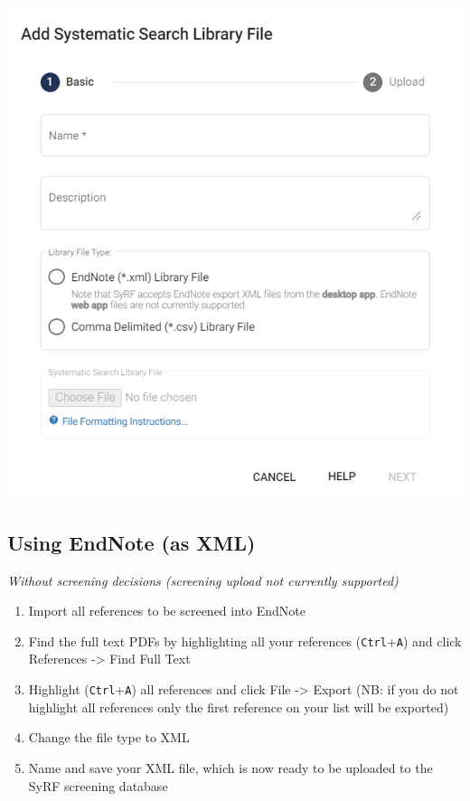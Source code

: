 \documentclass[
]{book}
\providecommand{\tightlist}{%
  \setlength{\itemsep}{0pt}\setlength{\parskip}{0pt}}
\begin{document}
\includegraphics[width=13.76in]{figs/Fig_Upload_search}

\hypertarget{using-endnote-as-xml}{%
\subsection{Using EndNote (as XML)}\label{using-endnote-as-xml}}

\emph{Without screening decisions (screening upload not currently supported)}

\begin{enumerate}
\def\labelenumi{\arabic{enumi}.}
\tightlist
\item
  Import all references to be screened into EndNote
\item
  Find the full text PDFs by highlighting all your references (\texttt{Ctrl}+\texttt{A}) and click References -\textgreater{} Find Full Text
\item
  Highlight (\texttt{Ctrl}+\texttt{A}) all references and click File -\textgreater{} Export (NB: if you do not highlight all references only the first reference on your list will be exported)
\item
  Change the file type to XML
\item
  Name and save your XML file, which is now ready to be uploaded to the SyRF screening database
\end{enumerate}
\end{document}
